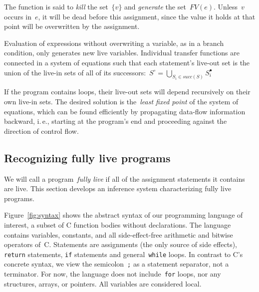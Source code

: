 \documentclass[a4paper]{easychair}
\newcommand{\liveout}[1]{\ensuremath{#1^{\circ}}}
\newcommand{\livein}[1]{\ensuremath{#1^{\bullet}}}
\begin{document}
The function is said to \emph{kill} the set~\(\{v\}\) and \emph{generate}
the set~\(FV(e)\). Unless~\(v\) occurs in~\(e\), it will be dead before this
assignment, since the value it holds at that point will be overwritten by
the assignment.

Evaluation of expressions without overwriting a variable,
as in a branch condition, only generates new live variables. Individual
transfer functions are connected in a system of equations such that each
statement's live-out set is the union of the live-in sets of all of its
successors:~\(\liveout{S} = \bigcup_{S_i \in \mathit{succ}(S)}
\livein{S_i}\)

If the program contains loops, their live-out sets will depend recursively
on their own live-in sets. The desired solution is the~\emph{least fixed
point} of the system of equations, which can be found efficiently by
propagating data-flow information backward, i.\,e., starting at the
program's end and proceeding against the direction of control flow.


\subsection{Recognizing fully live programs}

We will call a program~\emph{fully live} if all of the assignment statements
it contains are live. This section develops an inference system
characterizing fully live programs.

Figure~\ref{fig:syntax} shows the abstract syntax of our programming
language of interest, a subset of C function bodies without declarations.
The language contains variables, constants, and all side-effect-free
arithmetic and bitwise operators of~C. Statements are assignments (the only
source of side effects), \verb|return| statements, \verb|if| statements and
general~\verb|while| loops. In contrast to C's concrete syntax, we view the
semicolon~\verb|;| as a statement separator, not a terminator. For now, the
language does not include~\verb|for| loops, nor any structures, arrays, or
pointers. All variables are considered local.
\end{document}
